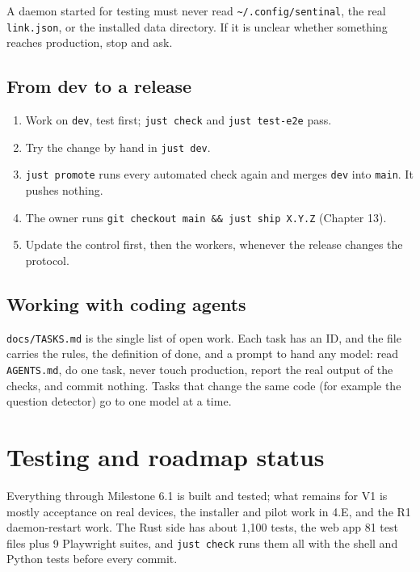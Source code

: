 \begin{srnote}[Rule]
A daemon started for testing must never read \texttt{\textasciitilde{}/\allowbreak{}.\allowbreak{}config/\allowbreak{}sentinal}, the real \texttt{link.\allowbreak{}json}, or the installed data directory. If it is unclear whether something reaches production, stop and ask.
\end{srnote}

\section{From dev to a release}

\begin{enumerate}
\item Work on \texttt{dev}, test first; \texttt{just\ check} and \texttt{just\ test-{}\allowbreak{}e2e} pass.
\item Try the change by hand in \texttt{just\ dev}.
\item \texttt{just\ promote} runs every automated check again and merges \texttt{dev} into \texttt{main}. It pushes nothing.
\item The owner runs \texttt{git\ checkout\ main\ \&\&\ just\ ship\ X.\allowbreak{}Y.\allowbreak{}Z} (Chapter 13).
\item Update the control first, then the workers, whenever the release changes the protocol.
\end{enumerate}

\section{Working with coding agents}

\texttt{docs/\allowbreak{}TASKS.\allowbreak{}md} is the single list of open work. Each task has an ID, and the file carries the rules, the definition of done, and a prompt to hand any model: read \texttt{AGENTS.\allowbreak{}md}, do one task, never touch production, report the real output of the checks, and commit nothing. Tasks that change the same code (for example the question detector) go to one model at a time.

\chapter{\texorpdfstring{Testing and roadmap status}{Testing and roadmap status}}

Everything through Milestone 6.1 is built and tested; what remains for V1 is mostly acceptance on real devices, the installer and pilot work in 4.E, and the R1 daemon-restart work. The Rust side has about 1,100 tests, the web app 81 test files plus 9 Playwright suites, and \texttt{just\ check} runs them all with the shell and Python tests before every commit.

